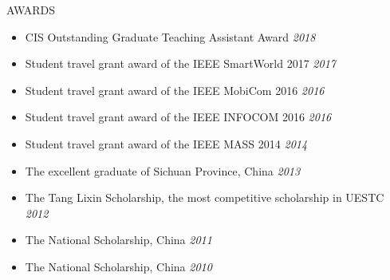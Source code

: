 \documentclass{resume} %
\begin{document}
\begin{rSection}{AWARDS}
\begin{itemize}
	\item {CIS Outstanding Graduate Teaching Assistant Award}  \hfill \textit{2018} \item  {Student travel grant award of the IEEE SmartWorld 2017}  \hfill \textit{2017} 
	\item {Student travel grant award of the IEEE MobiCom 2016}  \hfill \textit{2016} 
	\item {Student travel grant award of the IEEE INFOCOM 2016}  \hfill \textit{2016} 
    \item  {Student travel grant award of the IEEE MASS 2014}  \hfill \textit{2014} 
	\item {The excellent graduate of Sichuan Province, China}		\hfill \textit{2013} 
    \item {The Tang Lixin Scholarship, the most competitive scholarship in UESTC}						\hfill \textit{2012} 
\item  {The National Scholarship, China}							\hfill \textit{2011} 
	\item {The National Scholarship, China} 							\hfill \textit{2010}
	\end{itemize}
\end{rSection}








\end{document}
